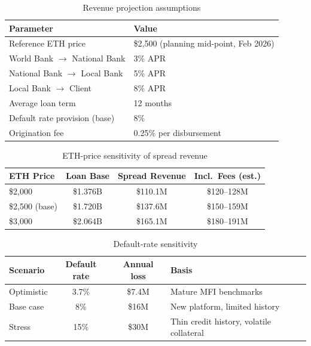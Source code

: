 \documentclass[12pt, a4paper]{report}
\newcommand{\tableheadcolor}{\rowcolor{TableHeadBg}}
\newcommand{\tableheadfont}{\bfseries}
\begin{document}
\begin{table}[H]
\centering
\caption[Revenue projection assumptions]{Revenue projection assumptions}
\label{tab:revenue-assumptions}
\begin{tabular}{p{6cm}p{7.5cm}}
\toprule
\tableheadcolor
\textbf{Parameter} & \textbf{Value} \\
\midrule
Reference ETH price & \$2{,}500 (planning mid-point, Feb 2026) \\
World Bank $\to$ National Bank & 3\% APR \\
National Bank $\to$ Local Bank & 5\% APR \\
Local Bank $\to$ Client & 8\% APR \\
Average loan term & 12 months \\
Default rate provision (base) & 8\% \\
Origination fee & 0.25\% per disbursement \\
\bottomrule
\end{tabular}
\end{table}

\vspace{2pt}

\begin{table}[H]
\centering
\caption[ETH-price sensitivity of spread revenue]{ETH-price sensitivity of spread revenue}
\begin{tabular}{@{}lccc@{}}
\toprule
\tableheadcolor
\tableheadfont ETH Price & \tableheadfont Loan Base & \tableheadfont Spread Revenue & \tableheadfont Incl.\ Fees (est.) \\
\midrule
\$2{,}000 & \$1.376B & \$110.1M & \$120--128M \\
\rowcolor{RowShade}
\$2{,}500 (base) & \$1.720B & \$137.6M & \$150--159M \\
\$3{,}000 & \$2.064B & \$165.1M & \$180--191M \\
\bottomrule
\end{tabular}
\end{table}

\vspace{2pt}

\begin{table}[H]
\centering
\caption[Default-rate sensitivity]{Default-rate sensitivity}
\label{tab:default-scenarios}
\begin{tabular}{@{}lccp{4.8cm}@{}}
\toprule
\tableheadcolor
\tableheadfont Scenario & \tableheadfont Default rate & \tableheadfont Annual loss & \tableheadfont Basis \\
\midrule
Optimistic & 3.7\% & \$7.4M & Mature MFI benchmarks~ \\
\rowcolor{RowShade}
Base case & 8\% & \$16M & New platform, limited history \\
Stress & 15\% & \$30M & Thin credit history, volatile collateral \\
\bottomrule
\end{tabular}
\end{table}
\end{document}
